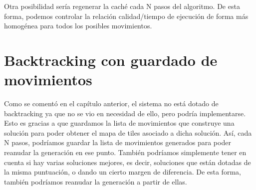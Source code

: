 Otra posibilidad sería regenerar la caché cada N pasos del algoritmo. De esta forma, podemos controlar la relación calidad/tiempo de ejecución de forma más homogénea para todos los posibles movimientos.

\section{Backtracking con guardado de movimientos}

Como se comentó en el capítulo anterior, el sistema no está dotado de backtracking ya que no se vio en necesidad de ello, pero podría implementarse. Esto es gracias a que guardamos la lista de movimientos que construye una solución para poder obtener el mapa de tiles asociado a dicha solución. Así, cada N pasos, podríamos guardar la lista de movimientos generados para poder reanudar la generación en ese punto. También podríamos simplemente tener en cuenta si hay varias soluciones mejores, es decir, soluciones que están dotadas de la misma puntuación, o dando un cierto margen de diferencia. De esta forma, también podríamos reanudar la generación a partir de ellas.
